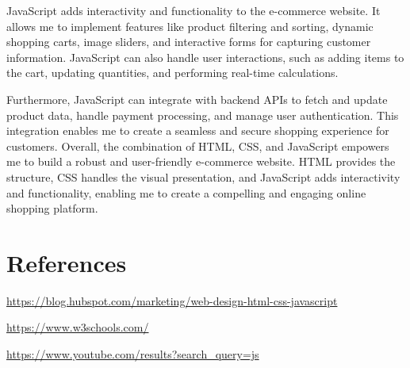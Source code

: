 \documentclass{article}
\begin{document}
JavaScript adds interactivity and functionality to the e-commerce website. It allows me to implement features like product filtering and sorting, dynamic shopping carts, image sliders, and interactive forms for capturing customer information. JavaScript can also handle user interactions, such as adding items to the cart, updating quantities, and performing real-time calculations.

Furthermore, JavaScript can integrate with backend APIs to fetch and update product data, handle payment processing, and manage user authentication. This integration enables me to create a seamless and secure shopping experience for customers.
Overall, the combination of HTML, CSS, and JavaScript empowers me to build a robust and user-friendly e-commerce website. HTML provides the structure, CSS handles the visual presentation, and JavaScript adds interactivity and functionality, enabling me to create a compelling and engaging online shopping platform.

\section{References}

\url{https://blog.hubspot.com/marketing/web-design-html-css-javascript}

\url{https://www.w3schools.com/}

\url{https://www.youtube.com/results?search_query=js}
\end{document}
